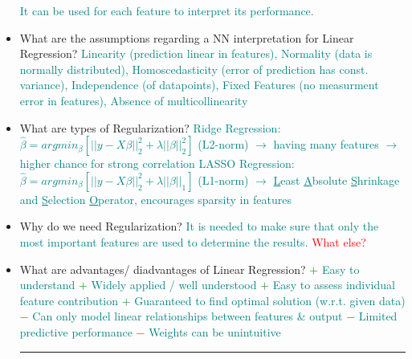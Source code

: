 \documentclass{report}
\newcommand{\asw}[2][teal]{}
\renewcommand{\asw}[2][teal]{\textcolor{#1}{#2}}
\newcommand{\qst}[2][red]{\textcolor{#1}{#2}}
\begin{document}
\begin{itemize}
	\asw{\newline It can be used for each feature to interpret its performance.}
	\item What are the assumptions regarding a NN interpretation for Linear Regression?
	\asw{\newline Linearity (prediction linear in features),
		\newline Normality (data is normally distributed),
		\newline Homoscedasticity (error of prediction has const. variance),
		\newline Independence (of datapoints),
		\newline Fixed Features (no measurment error in features),
		\newline Absence of multicollinearity}
	\item What are types of Regularization?
	\asw{\newline Ridge Regression: $\hat{\beta} = argmin_\beta[||y - X\beta||^2_2 + \lambda ||\beta||^2_2]$ (L2-norm)
		\newline $\rightarrow$ having many features $\rightarrow$ higher chance for strong correlation
		\newline LASSO Regression: $\hat{\beta} = argmin_\beta[||y - X\beta||^2_2 + \lambda ||\beta||_1]$ (L1-norm)
		\newline $\rightarrow$ \underline{L}east \underline{A}bsolute \underline{S}hrinkage and \underline{S}election \underline{O}perator, encourages sparsity in features}
	\item Why do we need Regularization?
	\asw{\newline It is needed to make sure that only the most important features are used to determine the results.
		\newline \qst{What else?}}
	\item What are advantages/ diadvantages of Linear Regression?
	\asw{\newline \textcolor{green}{$+$} Easy to understand
		\newline \textcolor{green}{$+$} Widely applied / well understood
		\newline \textcolor{green}{$+$} Easy to assess individual feature contribution
		\newline \textcolor{green}{$+$} Guaranteed to find optimal solution (w.r.t. given data)
		\newline \textcolor{red}{$-$} Can only model linear relationships between features \& output
		\newline \textcolor{red}{$-$} Limited predictive performance
		\newline \textcolor{red}{$-$} Weights can be unintuitive}
	\newline
	\hrule 
	

\end{itemize}
\end{document}
